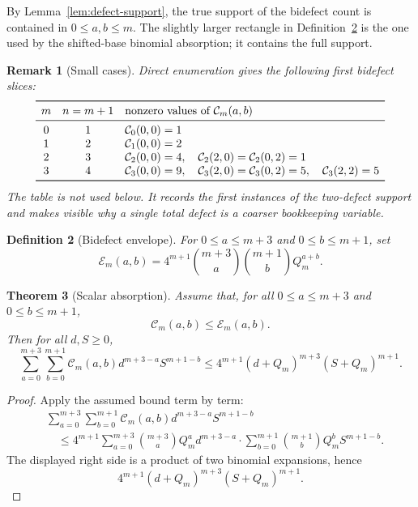 \documentclass[11pt]{article}
\numberwithin{equation}{section}
\newtheorem{theorem}{Theorem}[section]
\newtheorem{definition}[theorem]{Definition}
\newtheorem{remark}[theorem]{Remark}
\newcommand{\Count}{\mathcal C}
\newcommand{\Env}{\mathcal E}
\newcommand{\Loss}{Q}
\begin{document}
By Lemma~\ref{lem:defect-support}, the true support of the bidefect count is
contained in \(0\le a,b\le m\).  The slightly larger rectangle in
Definition~\ref{def:envelope} is the one used by the shifted-base binomial
absorption; it contains the full support.

\begin{remark}[Small cases]
Direct enumeration gives the following first bidefect slices:
\[
\begin{array}{ccl}
\toprule
m & n=m+1 & \text{nonzero values of }\Count_m(a,b)\\
\midrule
0 & 1 & \Count_0(0,0)=1\\
1 & 2 & \Count_1(0,0)=2\\
2 & 3 & \Count_2(0,0)=4,\quad
        \Count_2(2,0)=\Count_2(0,2)=1\\
3 & 4 & \Count_3(0,0)=9,\quad
        \Count_3(2,0)=\Count_3(0,2)=5,\quad
        \Count_3(2,2)=5\\
\bottomrule
\end{array}
\]
The table is not used below.  It records the first instances of the
two-defect support and makes visible why a single total defect is a coarser
bookkeeping variable.
\end{remark}

\begin{definition}[Bidefect envelope]\label{def:envelope}
For \(0\le a\le m+3\) and \(0\le b\le m+1\), set
\[
  \Env_m(a,b)
  =
  4^{m+1}
  \binom{m+3}{a}
  \binom{m+1}{b}
  \Loss_m^{a+b}.
\]
\end{definition}

\begin{theorem}[Scalar absorption]\label{thm:scalar-absorption}
Assume that, for all \(0\le a\le m+3\) and \(0\le b\le m+1\),
\[
  \Count_m(a,b)\le \Env_m(a,b).
\]
Then for all \(d,S\ge0\),
\[
  \sum_{a=0}^{m+3}\sum_{b=0}^{m+1}
    \Count_m(a,b)d^{m+3-a}S^{m+1-b}
  \le
  4^{m+1}(d+\Loss_m)^{m+3}(S+\Loss_m)^{m+1}.
\]
\end{theorem}

\begin{proof}
Apply the assumed bound term by term:
\[
\begin{aligned}
&\sum_{a=0}^{m+3}\sum_{b=0}^{m+1}
    \Count_m(a,b)d^{m+3-a}S^{m+1-b} \\
&\quad\le
4^{m+1}
\sum_{a=0}^{m+3}\binom{m+3}{a}\Loss_m^a d^{m+3-a}
\cdot
\sum_{b=0}^{m+1}\binom{m+1}{b}\Loss_m^b S^{m+1-b}.
\end{aligned}
\]
The displayed right side is a product of two binomial expansions, hence
\[
  4^{m+1}(d+\Loss_m)^{m+3}(S+\Loss_m)^{m+1}.
\]
\end{proof}
\end{document}
